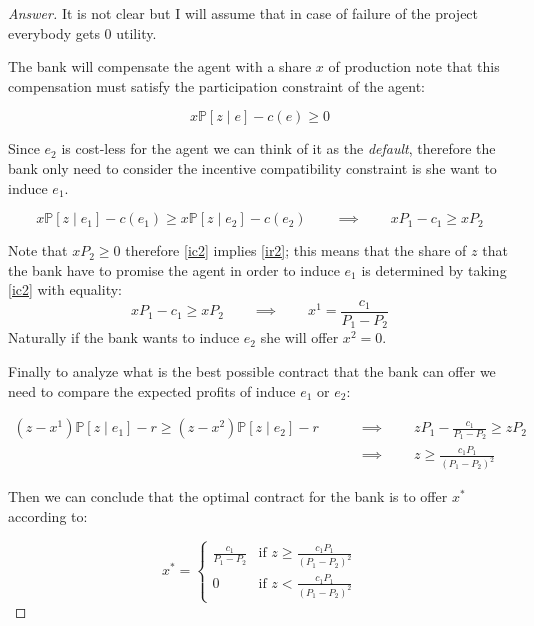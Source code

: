 \documentclass[12pt]{article}
\theoremstyle{definition}
\newcommand{\qiq}{\qquad \implies \qquad}
\begin{document}
\begin{proof}[Answer]

It is not clear but I will assume that in case of failure of the project everybody gets $0$ utility.

The bank will compensate the agent with a share $x$ of production note that this compensation must satisfy the participation constraint of the agent:

\begin{equation}\label{ir2}\tag{IR}
    x\mathbb{P}[z\mid e] - c(e) \geq 0
\end{equation}

Since $e_2$ is cost-less for the agent we can think of it as the \textit{default}, therefore the bank only need to consider the incentive compatibility constraint is she want to induce $e_1$. 

\begin{equation}\label{ic2}\tag{IC}
     x\mathbb{P}[z\mid e_1] - c(e_1) \geq x\mathbb{P}[z\mid e_2] - c(e_2) \qiq x P_1 -  c_1 \geq xP_2
\end{equation}

Note that $xP_2 \geq 0$ therefore \eqref{ic2} implies \eqref{ir2}; this means that the share of $z$ that the bank have to promise the agent in order to induce $e_1$ is determined by taking \eqref{ic2} with equality:
$$x P_1 -  c_1 \geq xP_2 \qiq x^1 = \frac{c_1}{P_1 - P_2}$$
 Naturally if the bank wants to induce $e_2$ she will offer $x^2 = 0$.
 
 Finally to analyze what is the best possible contract that the bank can offer we need to compare the expected profits of induce $e_1$ or $e_2$:
 
 \begin{align*}
    (z-x^1)\mathbb{P}[z\mid e_1] - r \geq (z-x^2)\mathbb{P}[z\mid e_2] - r &\qiq z P_1 - \frac{c_1}{P_1 - P_2} \geq z P_2 \\ &\qiq z \geq \frac{c_1 P_1}{(P_1 - P_2)^2} 
 \end{align*}
 
 Then we can conclude that the optimal contract for the bank is to offer $x^*$ according to:
 
 $$x^* = \left\{ \begin{array}{cc}
     \frac{c_1}{P_1 - P_2}  & \text{if } z \geq \frac{c_1 P_1}{(P_1 - P_2)^2}  \\
     0 &  \text{if } z < \frac{c_1 P_1}{(P_1 - P_2)^2} 
 \end{array} \right.$$ 
 
  
\end{proof}
\end{document}
